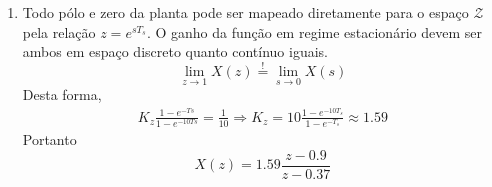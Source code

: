 \documentclass{article}
\begin{document}
\begin{enumerate}
\item %
Todo pólo e zero da planta pode ser mapeado diretamente para o espaço $\mathcal{Z}$ pela relação $z = e^{s T_s}$. O ganho da função em regime estacionário devem ser ambos em espaço discreto quanto contínuo iguais.
\begin{equation}
\lim\limits_{z \rightarrow 1} X(z) \stackrel{!}{=} \lim\limits_{s \rightarrow 0} X(s) 
\end{equation} 
Desta forma,
\begin{equation*}
\begin{split}
K_z \frac{1 - e^{-Ts}}{1 - e^{-10Ts}} = \frac{1}{10} \Rightarrow K_z = 10 \frac{1 - e^{-10T_s}}{1 - e^{-T_s}} \approx 1.59
\end{split}
\end{equation*}
Portanto
\begin{equation}
X(z) = 1.59 \frac{z - 0.9}{z - 0.37}
\end{equation}
\end{enumerate}
\end{document}
